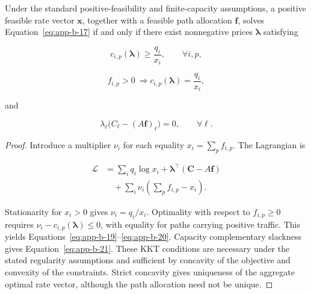 \begin{theorem}
\label{thm:b-2}
Under the standard positive-feasibility and finite-capacity assumptions, a positive feasible rate vector \(\mathbf x\), together with a feasible path allocation \(\mathbf f\), solves Equation~\eqref{eq:app-b-17} if and only if there exist nonnegative prices \(\boldsymbol\lambda\) satisfying

\begin{equation}
\label{eq:app-b-19}
c_{i,p}(\boldsymbol\lambda)\ge\frac{q_i}{x_i},
\qquad \forall i,p,
\end{equation}

\begin{equation}
\label{eq:app-b-20}
f_{i,p}>0
\ \Longrightarrow
c_{i,p}(\boldsymbol\lambda)=\frac{q_i}{x_i},
\end{equation}

and

\begin{equation}
\label{eq:app-b-21}
\lambda_\ell
\big(C_\ell-(A\mathbf f)_\ell\big)=0,
\qquad\forall\ell.
\end{equation}
\end{theorem}

\begin{proof} Introduce a multiplier \(\nu_i\) for each equality \(x_i=\sum_p f_{i,p}\). The Lagrangian is

\begin{equation}
\label{eq:app-b-22}
\begin{aligned}
\mathcal L
&=\sum_iq_i\log x_i
+\boldsymbol\lambda^\top(\mathbf C-A\mathbf f)\\
&\quad+\sum_i\nu_i\left(\sum_pf_{i,p}-x_i\right).
\end{aligned}
\end{equation}

Stationarity for \(x_i>0\) gives \(\nu_i=q_i/x_i\). Optimality with respect to \(f_{i,p}\ge0\) requires \(\nu_i-c_{i,p}(\boldsymbol\lambda)\le0\), with equality for paths carrying positive traffic. This yields Equations~\eqref{eq:app-b-19}–\eqref{eq:app-b-20}. Capacity complementary slackness gives Equation~\eqref{eq:app-b-21}. These KKT conditions are necessary under the stated regularity assumptions and sufficient by concavity of the objective and convexity of the constraints. Strict concavity gives uniqueness of the aggregate optimal rate vector, although the path allocation need not be unique.
\end{proof}

